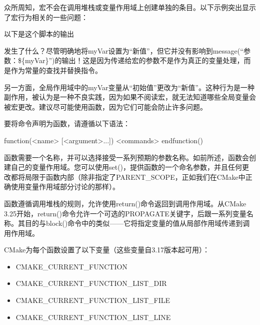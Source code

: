 众所周知，宏不会在调用堆栈或变量作用域上创建单独的条目。以下示例突出显示了宏行为相关的一些问题：



以下是这个脚本的输出


发生了什么？尽管明确地将myVar设置为“新值”，但它并没有影响到message(“参数：\$\{myVar\}”)的输出！这是因为传递给宏的参数不是作为真正的变量处理，而是作为常量的查找并替换指令。

另一方面，全局作用域中的myVar变量从“初始值”更改为“新值”。这种行为是一种副作用，被认为是一种不良实践，因为如果不阅读宏，就无法知道哪些全局变量会被宏更改。建议尽可能使用函数，因为它们可能会防止许多问题。


要将命令声明为函数，请遵循以下语法：

\begin{shell}
function(<name> [<argument>...])
    <commands>
endfunction()
\end{shell}

函数需要一个名称，并可以选择接受一系列预期的参数名称。如前所述，函数会创建自己的变量作用域。您可以使用set()，提供函数的一个命名参数，并且任何更改都将局限于函数内部（除非指定了PARENT\_SCOPE，正如我们在CMake中正确使用变量作用域部分讨论的那样）。

函数遵循调用堆栈的规则，允许使用return()命令返回到调用作用域。从CMake 3.25开始，return()命令允许一个可选的PROPAGATE关键字，后跟一系列变量名称。其目的与block()命令中的类似——它将指定变量的值从局部作用域传递到调用作用域。

CMake为每个函数设置了以下变量（这些变量自3.17版本起可用）：

\begin{itemize}
\item
CMAKE\_CURRENT\_FUNCTION

\item
CMAKE\_CURRENT\_FUNCTION\_LIST\_DIR

\item
CMAKE\_CURRENT\_FUNCTION\_LIST\_FILE

\item
CMAKE\_CURRENT\_FUNCTION\_LIST\_LINE
\end{itemize}

